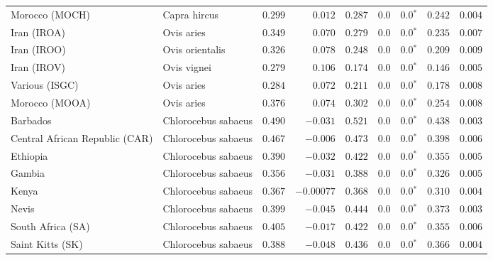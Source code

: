 \begin{center}
\begin{adjustbox}{width = 1\textwidth}
\begin{tabular}{|l|l|r|r|r|r|r|r|r|}
            Morocco (MOCH)                    & Capra hircus     & $ 0.299$ & $ 0.012$   & $ 0.287$ & $0.0$    & $\bm{0.0{^*}}$ & $ 0.242$ & $ 0.004$ \\
            Iran (IROA)                    & Ovis aries         & $ 0.349$ & $ 0.070$   & $ 0.279$ & $0.0$    & $\bm{0.0{^*}}$ & $ 0.235$ & $ 0.007$ \\
            Iran (IROO)                 & Ovis orientalis          & $ 0.326$ & $ 0.078$   & $ 0.248$ & $0.0$    & $\bm{0.0{^*}}$ & $ 0.209$ & $ 0.009$ \\
            Iran (IROV)                 & Ovis vignei          & $ 0.279$ & $ 0.106$   & $ 0.174$ & $0.0$    & $\bm{0.0{^*}}$ & $ 0.146$ & $ 0.005$ \\
            Various (ISGC)                       & Ovis aries & $ 0.284$ & $ 0.072$   & $ 0.211$ & $0.0$    & $\bm{0.0{^*}}$ & $ 0.178$ & $ 0.008$ \\
            Morocco (MOOA) & Ovis aries & $ 0.376$ & $ 0.074$   & $ 0.302$ & $0.0$ & $\bm{0.0{^*}}$ & $ 0.254$ & $ 0.008$ \\
            Barbados                       & Chlorocebus sabaeus & $ 0.490$ & $-0.031$   & $ 0.521$ & $0.0$    & $\bm{0.0{^*}}$ & $ 0.438$ & $ 0.003$ \\
            Central African Republic (CAR)                         & Chlorocebus sabaeus & $ 0.467$ & $-0.006$   & $ 0.473$ & $0.0$    & $\bm{0.0{^*}}$ & $ 0.398$ & $ 0.006$ \\
            Ethiopia                          & Chlorocebus sabaeus & $ 0.390$ & $-0.032$ & $ 0.422$ & $0.0$    & $\bm{0.0{^*}}$ & $ 0.355$ & $ 0.005$ \\
            Gambia                          & Chlorocebus sabaeus & $ 0.356$ & $-0.031$   & $ 0.388$ & $0.0$    & $\bm{0.0{^*}}$ & $ 0.326$ & $ 0.005$ \\
            Kenya              & Chlorocebus sabaeus & $ 0.367$ & $-0.00077$   & $ 0.368$ & $0.0$    & $\bm{0.0{^*}}$ & $ 0.310$ & $ 0.004$ \\
            Nevis               & Chlorocebus sabaeus & $ 0.399$ & $-0.045$   & $ 0.444$ & $0.0$    & $\bm{0.0{^*}}$ & $ 0.373$ & $ 0.003$ \\
            South Africa (SA)                         & Chlorocebus sabaeus & $ 0.405$ & $-0.017$   & $ 0.422$ & $0.0$    & $\bm{0.0{^*}}$ & $ 0.355$ & $ 0.006$ \\
            Saint Kitts (SK)                  & Chlorocebus sabaeus        & $ 0.388$ & $-0.048$   & $ 0.436$ & $0.0$ & $\bm{0.0{^*}}$     & $ 0.366$ & $ 0.004$ \\

\end{tabular}
\end{adjustbox}
\end{center}
